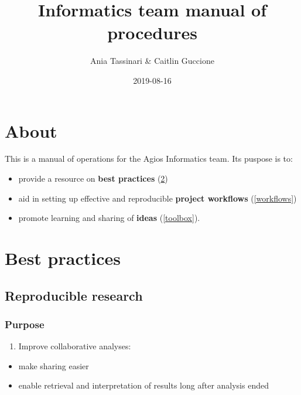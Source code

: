 \documentclass[openany]{book}
\title{Informatics team manual of procedures}
\author{Ania Tassinari \& Caitlin Guccione}
\date{2019-08-16}
\providecommand{\tightlist}{%
  \setlength{\itemsep}{0pt}\setlength{\parskip}{0pt}}
\begin{document}
\maketitle

{
\hypersetup{linkcolor=black}
\setcounter{tocdepth}{1}
\tableofcontents
}
\hypertarget{about}{%
\chapter{About}\label{about}}

This is a manual of operations for the Agios Informatics team. Its puspose is to:

\begin{itemize}
\tightlist
\item
  provide a resource on \textbf{best practices} (\ref{bestpractices})
\item
  aid in setting up effective and reproducible \textbf{project workflows} (\ref{workflows})
\item
  promote learning and sharing of \textbf{ideas} (\ref{toolbox}).
\end{itemize}

\hypertarget{bestpractices}{%
\chapter{Best practices}\label{bestpractices}}

\hypertarget{reproducible-research}{%
\section{Reproducible research}\label{reproducible-research}}

\hypertarget{purpose}{%
\subsection{Purpose}\label{purpose}}

\begin{enumerate}
\def\labelenumi{\arabic{enumi}.}
\tightlist
\item
  Improve collaborative analyses:
\end{enumerate}

\begin{itemize}
\tightlist
\item
  make sharing easier
\item
  enable retrieval and interpretation of results long after analysis ended
\end{itemize}
\end{document}
